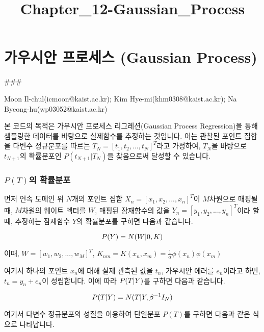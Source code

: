 \documentclass[11pt]{article}
\title{Chapter\_12-Gaussian\_Process}
\begin{document}
    
    
    \maketitle
    
    

    
    \hypertarget{uxac00uxc6b0uxc2dcuxc548-uxd504uxb85cuxc138uxc2a4-gaussian-process}{%
\section{가우시안 프로세스 (Gaussian
Process)}\label{uxac00uxc6b0uxc2dcuxc548-uxd504uxb85cuxc138uxc2a4-gaussian-process}}

\#\#\#

Moon Il-chul(icmoon@kaist.ac.kr); Kim Hye-mi(khm0308@kaist.ac.kr); Na
Byeong-hu(wp03052@kaist.ac.kr)

본 코드의 목적은 가우시안 프로세스 리그레션(Gaussian Process
Regression)을 통해 샘플링한 데이터를 바탕으로 실제함수를 추정하는
것입니다. 이는 관찰된 포인트 집합을 다변수 정규분포를 따르는
\(T_N = [t_1, t_2, ..., t_N]^T\)라고 가정하여, \(T_N\)을 바탕으로
\(t_{N+1}\)의 확률분포인 \(P(t_{N+1}|T_N)\)을 찾음으로써 달성할 수
있습니다.

\hypertarget{ptuxc758-uxd655uxb960uxbd84uxd3ec}{%
\subsubsection{\texorpdfstring{\(P(T)\)의
확률분포}{P(T)의 확률분포}}\label{ptuxc758-uxd655uxb960uxbd84uxd3ec}}

먼저 연속 도메인 위 \(N\)개의 포인트 집합
\(X_n=[x_1, x_2, ..., x_n]^T\)이 \(M\)차원으로 매핑될 때, \(M\)차원의
웨이트 벡터를 \(W\), 매핑된 잠재함수의 값을
\(Y_n=[y_1, y_2, ..., y_n]^T\)이라 할 때, 추정하는 잠재함수 \(Y\)의
확률분포를 구하면 다음과 같습니다.

\[P(Y) = N(W|\space0, K)\]

이때, \(W=[w_1, w_2, ..., w_M]^T\),
\(K_{nm} = K(x_n, x_m) = \frac{1}{\alpha}\phi(x_n)\phi(x_m)\)

여기서 하나의 포인트 \(x_n\)에 대해 실제 관측된 값을 \(t_n\), 가우시안
에러를 \(e_n\)이라고 하면, \(t_n=y_n+e_n\)이 성립합니다. 이에 따라
\(P(T|\space Y)\)를 구하면 다음과 같습니다.

\[P(T|\space Y)=N(T|\space Y, \beta^{-1}I_N)\]

여기서 다변수 정규분포의 성질을 이용하여 단일분포 \(P(T)\)를 구하면
다음과 같은 식으로 나타납니다.
\end{document}
